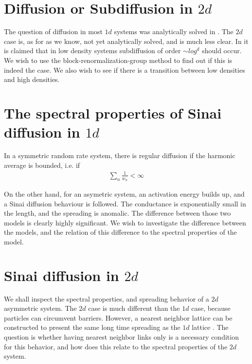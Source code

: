\section{Diffusion or Subdiffusion in $2d$}

The question of diffusion in most $1d$ systems was analytically solved in \cite{alexander_excitation_1981}. The $2d$ case is, as for as we know, not yet analytically solved, and is much less clear. In \cite{amir_localization_2010} it is claimed that in low density systems subdiffusion of order $\sim log^d$ should occur. We wish to use the block-renormalization-group method to find out if this is indeed the case. We also wish to see if there is a transition between low densities and high densities.



\section{The spectral properties of Sinai diffusion in $1d$}

In a symmetric random rate system, there is regular diffusion if the harmonic average is bounded, i.e. if
%
\begin{align}
 \sum_n \frac{1}{w_n} < \infty 
\end{align}
%

On the other hand, for an asymetric system, an activation energy builds up, and a Sinai diffusion behaviour is followed.
The conductance is exponentially small in the length, and the spreading is anomalic. The difference between those two models is clearly highly significant. We wish to investigate the difference between the models, and the relation of this difference to the spectral properties of the model.

\section{Sinai diffusion in $2d$}

We shall inspect the spectral properties, and spreading behavior of a $2d$ asymmetric system. The
$2d$ case is much different than the $1d$ case, because particles can circumvent barriers. However,
a nearest neighbor lattice can be constructed to present the same long time spreading as the $1d$ lattice \cite{blumberg_selinger_diffusion_1989}.
The question is whether having nearest neighbor links only is a necessary condition for this behavior,
and how does this relate to the spectral properties of the $2d$ system.


